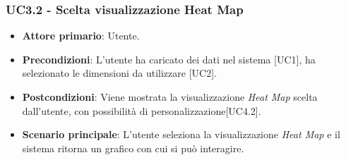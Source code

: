 \subsubsection{UC3.2 - Scelta visualizzazione Heat Map}
\begin{itemize}
	\item \textbf{Attore primario}: Utente.
	\item \textbf{Precondizioni}: L'utente ha caricato dei dati nel sistema [UC1], ha selezionato le dimensioni da utilizzare [UC2].
	\item \textbf{Postcondizioni}: Viene mostrata la visualizzazione \textit{Heat Map} scelta dall'utente, con possibilità di personalizzazione[UC4.2].
	\item \textbf{Scenario principale}: L'utente seleziona la visualizzazione \textit{Heat Map} e il sistema ritorna un grafico con cui si può interagire.

\end{itemize}